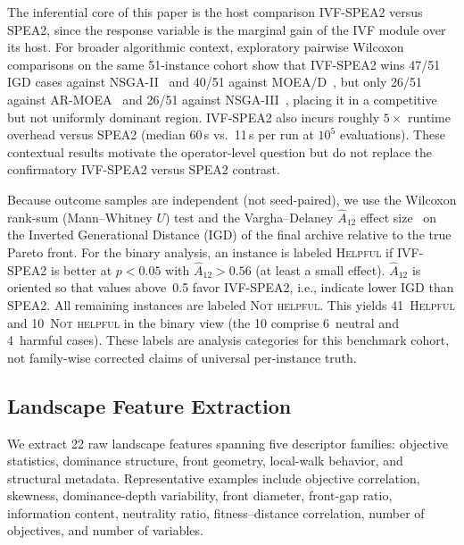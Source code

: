 \documentclass[conference]{IEEEtran}
\begin{document}
The inferential core of this paper is the host comparison IVF-SPEA2 versus
SPEA2, since the response variable is the marginal gain of the IVF module
over its host. For broader algorithmic context, exploratory pairwise Wilcoxon comparisons
on the same 51-instance cohort show that IVF-SPEA2 wins 47/51 IGD cases
against NSGA-II~\cite{deb2002fast} and 40/51 against MOEA/D~\cite{zhang2007moead}, but only 26/51 against AR-MOEA~\cite{tian2018indicator}
and 26/51 against NSGA-III~\cite{deb2014evolutionary}, placing it in a competitive but not uniformly
dominant region. IVF-SPEA2 also incurs roughly $5{\times}$ runtime overhead
versus SPEA2 (median 60\,s vs.\ 11\,s per run at $10^5$ evaluations).
These contextual results motivate the operator-level question but do not
replace the confirmatory IVF-SPEA2 versus SPEA2 contrast.

Because outcome samples are independent (not seed-paired), we use the
Wilcoxon rank-sum (Mann--Whitney $U$) test and the Vargha--Delaney
$\hat{A}_{12}$ effect size~\cite{arcuri2011practical,vargha2000critique} on
the Inverted Generational Distance (IGD) of the final archive relative to
the true Pareto front.
For the binary analysis, an instance is labeled \textsc{Helpful} if IVF-SPEA2 is
better at $p < 0.05$ with $\hat{A}_{12} > 0.56$ (at least a small effect).
$\hat{A}_{12}$ is oriented so that values above~0.5 favor IVF-SPEA2, i.e.,
indicate lower IGD than SPEA2. All
remaining instances are labeled \textsc{Not helpful}. This yields
41~\textsc{Helpful} and 10~\textsc{Not helpful} in the binary view (the 10
comprise 6~neutral and 4~harmful cases). These labels are analysis categories
for this benchmark cohort, not family-wise corrected claims of universal
per-instance truth.

\subsection{Landscape Feature Extraction}
\label{sec:fla_features}

We extract 22 raw landscape features spanning five descriptor families:
objective statistics, dominance structure, front geometry, local-walk
behavior, and structural metadata. Representative examples include
objective correlation, skewness, dominance-depth variability,
front diameter, front-gap ratio, information content, neutrality ratio,
fitness--distance correlation, number of objectives, and number of
variables.
\end{document}
